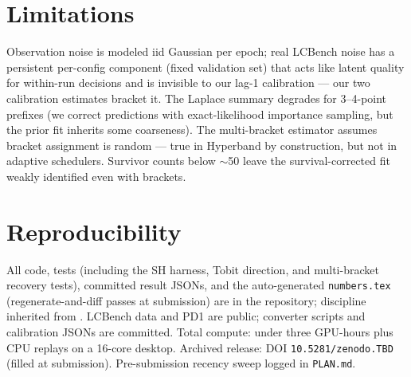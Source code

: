 \documentclass[10pt]{article}
\begin{document}
\section{Limitations}

Observation noise is modeled iid Gaussian per epoch; real LCBench noise
has a persistent per-config component (fixed validation set) that acts
like latent quality for within-run decisions and is invisible to our
lag-1 calibration --- our two calibration estimates bracket it. The
Laplace summary degrades for 3--4-point prefixes (we correct predictions
with exact-likelihood importance sampling, but the prior fit inherits
some coarseness). The multi-bracket estimator assumes bracket assignment
is random --- true in Hyperband by construction, but not in adaptive
schedulers. Survivor counts below $\sim$50 leave the survival-corrected
fit weakly identified even with brackets.

\section{Reproducibility}
\label{sec:repro}

All code, tests (including the SH harness, Tobit direction, and
multi-bracket recovery tests), committed result JSONs, and the
auto-generated \texttt{numbers.tex} (regenerate-and-diff passes at
submission) are in the repository; discipline inherited from
\citet{howe2026eventrice}. LCBench data \citep{zimmer2021lcbench} and
PD1 \citep{wang2022pd1} are public; converter scripts and calibration
JSONs are committed. Total compute: under three GPU-hours plus CPU
replays on a 16-core desktop. Archived release: DOI
\texttt{10.5281/zenodo.TBD} (filled at submission). Pre-submission
recency sweep logged in \texttt{PLAN.md}.



\end{document}
